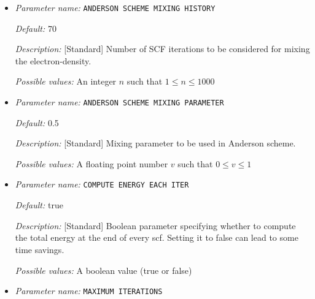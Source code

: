 \begin{itemize}
\item {\it Parameter name:} {\tt ANDERSON SCHEME MIXING HISTORY}
\label{parameters:SCF parameters/ANDERSON SCHEME MIXING HISTORY}
\label{parameters:SCF_20parameters/ANDERSON_20SCHEME_20MIXING_20HISTORY}




{\it Default:} 70


{\it Description:} [Standard] Number of SCF iterations to be considered for mixing the electron-density.


{\it Possible values:} An integer $n$ such that $1\leq n \leq 1000$
\item {\it Parameter name:} {\tt ANDERSON SCHEME MIXING PARAMETER}
\label{parameters:SCF parameters/ANDERSON SCHEME MIXING PARAMETER}
\label{parameters:SCF_20parameters/ANDERSON_20SCHEME_20MIXING_20PARAMETER}




{\it Default:} 0.5


{\it Description:} [Standard] Mixing parameter to be used in Anderson scheme.


{\it Possible values:} A floating point number $v$ such that $0 \leq v \leq 1$
\item {\it Parameter name:} {\tt COMPUTE ENERGY EACH ITER}
\label{parameters:SCF parameters/COMPUTE ENERGY EACH ITER}
\label{parameters:SCF_20parameters/COMPUTE_20ENERGY_20EACH_20ITER}




{\it Default:} true


{\it Description:} [Standard] Boolean parameter specifying whether to compute the total energy at the end of every scf. Setting it to false can lead to some time savings.


{\it Possible values:} A boolean value (true or false)
\item {\it Parameter name:} {\tt MAXIMUM ITERATIONS}
\label{parameters:SCF parameters/MAXIMUM ITERATIONS}
\label{parameters:SCF_20parameters/MAXIMUM_20ITERATIONS}





\end{itemize}
